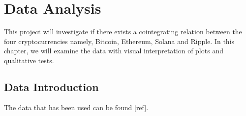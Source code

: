 \chapter{Data Analysis}
This project will investigate if there exists a cointegrating relation between the four cryptocurrencies namely, Bitcoin, Ethereum, Solana and Ripple. In this chapter, we will examine the data with visual interpretation of plots and qualitative tests.

\section{Data Introduction}
The data that has been used can be found [ref].\\




\begin{figure}[!ht]
  \centering
  \quad
  \\
  \quad

\end{figure}

